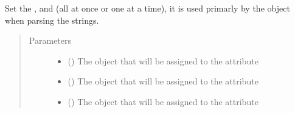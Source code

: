 \documentclass[letterpaper,10pt,english]{sphinxmanual}
\begin{document}
\begin{fulllineitems}
\begin{fulllineitems}
\begin{quote}
\begin{description}
\end{description}\end{quote}

\end{fulllineitems}


\begin{fulllineitems}
\label{\detokenize{model:mini_sql.model.foreign_key.ForeignKey.set_objects}}
\sphinxAtStartPar
Set the ,  and  (all at once or one at a time),
it is used primarly by the  object when parsing the strings.
\begin{quote}\begin{description}
\item[{Parameters}] \leavevmode\begin{itemize}
\item {} 
\sphinxAtStartPar
{} ({\hyperref[\detokenize{model:mini_sql.model.column.Column}]{}}\sphinxstyleliteralemphasis{\sphinxupquote{, }}) \textendash{} The object that will be assigned to the  attribute

\item {} 
\sphinxAtStartPar
{} ({\hyperref[\detokenize{model:mini_sql.model.table.Table}]{}}\sphinxstyleliteralemphasis{\sphinxupquote{, }}) \textendash{} The object that will be assigned to the  attribute

\item {} 
\sphinxAtStartPar
{} ({\hyperref[\detokenize{model:mini_sql.model.column.Column}]{}}\sphinxstyleliteralemphasis{\sphinxupquote{, }}) \textendash{} The object that will be assigned to the  attribute


\end{itemize}
\end{description}
\end{quote}
\end{fulllineitems}
\end{fulllineitems}
\end{document}
